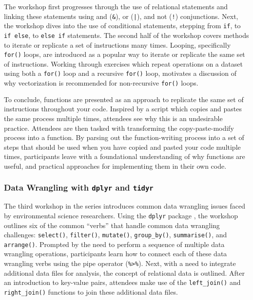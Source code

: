 \documentclass[12pt]{article}
\begin{document}
\quad The workshop first progresses through the use of relational
statements and linking these statements using and (\texttt{\&}), or
(\texttt{|}), and not (\texttt{!}) conjunctions. Next, the workshop dives into
the use of conditional statements, stepping from \texttt{if}, to \texttt{if
else}, to \texttt{else if} statements. The second half of the workshop covers
methods to iterate or replicate a set of instructions many times. Looping,
specifically \texttt{for()} loops, are introduced as a popular way to iterate or
replicate the same set of instructions. Working through exercises which
repeat operations on a dataset using both a \texttt{for()} loop and a recursive 
\texttt{for()} loop, motivates a discussion of why vectorization is 
recommended for non-recursive \texttt{for()} loops.

\quad To conclude, functions are presented as an approach to replicate the same
set of instructions throughout your code. Inspired by a script
which copies and pastes the same process multiple times, attendees see
why this is an undesirable practice. Attendees are then tasked with transforming
the copy-paste-modify process into a function. By parsing out the function-writing
process into a set of steps that should be used when you have copied and
pasted your code multiple times, participants leave with a foundational
understanding of why functions are useful, and practical approaches for
implementing them in their own code.

\subsubsection{Data Wrangling with \texttt{dplyr} and \texttt{tidyr}}
\label{sec:wrangle}

\noindent The third workshop in the series introduces common data wrangling
issues faced by environmental science researchers. Using the \texttt{dplyr} 
package \citep{dplyr}, the workshop outlines six of the common ``verbs'' that
handle common data wrangling challenges: \texttt{select()}, \texttt{filter()},
\texttt{mutate()}, \texttt{group\_by()}, \texttt{summarise()}, and
\texttt{arrange()}. Prompted by the need to perform a sequence of multiple data
wrangling operations, participants learn how to connect each of these
data wrangling verbs using the pipe operator (\texttt{\%>\%}). Next, with a 
need to integrate additional data files for analysis, the concept of relational
data is outlined. After an introduction to key-value pairs, attendees
make use of the \texttt{left\_join()} and \texttt{right\_join()} functions to
join these additional data files. 
\end{document}

